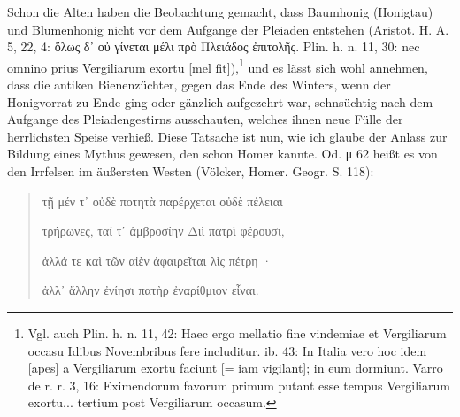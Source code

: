 \documentclass[a4paper, 11pt, oneside]{article}
\begin{document}
Schon die Alten haben die Beobachtung gemacht, dass Baumhonig (Honigtau) und Blumenhonig nicht vor dem Aufgange der Pleiaden entstehen (Aristot. H. A. 5, 22, 4: ὅλως δ᾽ οὐ γίνεται μέλι πρὸ Πλειάδος ἐπιτολῆς. Plin. h. n. 11, 30: nec omnino prius Vergiliarum exortu [mel fit]),\footnote{Vgl. auch Plin. h. n. 11, 42: Haec ergo mellatio fine vindemiae et Vergiliarum occasu Idibus Novembribus fere includitur. ib. 43: In Italia vero hoc idem [apes] a Vergiliarum exortu faciunt [= iam vigilant]; in eum dormiunt. Varro de r. r. 3, 16: Eximendorum favorum primum putant esse tempus Vergiliarum exortu... tertium post Vergiliarum occasum.} und es lässt sich wohl annehmen, dass die antiken Bienenzüchter, gegen das Ende des Winters, wenn der Honigvorrat zu Ende ging oder gänzlich aufgezehrt war, sehnsüchtig nach dem Aufgange des Pleiadengestirns ausschauten, welches ihnen neue Fülle der herrlichsten Speise verhieß. Diese Tatsache ist nun, wie ich glaube der Anlass zur Bildung eines Mythus gewesen, den schon Homer kannte. Od. μ 62 heißt es von den Irrfelsen im äußersten Westen (Völcker, Homer. Geogr. S. 118):
\begin{quotation}\large
τῇ μέν τ᾽ οὐδὲ ποτητὰ παρέρχεται οὐδὲ πέλειαι

τρήρωνες, ταί τ᾽ ἀμβροσίην Διὶ πατρὶ φέρουσι,

ἀλλά τε καὶ τῶν αἰὲν ἀφαιρεῖται λὶς πέτρη ·

ἀλλ᾽ ἄλλην ἐνίησι πατὴρ ἐναρίθμιον εἶναι.
\end{quotation}
\end{document}
